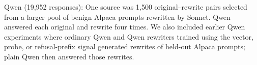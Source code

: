 \documentclass{article}
\begin{document}
Qwen (19,952 responses): One source was 1,500 original–rewrite pairs selected from a larger pool of benign Alpaca prompts rewritten by Sonnet. Qwen answered each original and rewrite four times. We also included earlier Qwen experiments where ordinary Qwen and Qwen rewriters trained using the vector, probe, or refusal-prefix signal generated rewrites of held-out Alpaca prompts; plain Qwen then answered those rewrites.



\end{document}
